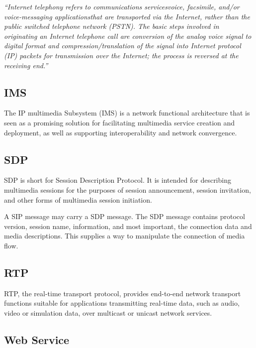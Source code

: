 \textit{``Internet telephony refers to communications services\textthreequartersemdash{}voice, facsimile, and/or voice-messaging applications\textthreequartersemdash{}that are transported via the Internet, rather than the public switched telephone network (PSTN). The basic steps involved in originating an Internet telephone call are conversion of the analog voice signal to digital format and compression/translation of the signal into Internet protocol (IP) packets for transmission over the Internet; the process is reversed at the receiving end.''} \cite{VoIPtheProtocol}


\subsection*{IMS}
\label{sec:IMS}
\label{sym:IMS}

The IP multimedia Subsystem (IMS) is a network functional architecture that is seen as a promising solution for facilitating multimedia service creation and deployment, as well as supporting interoperability and network convergence. \cite{IMSInNextGenerationNetworks}



\subsection*{SDP}
\label{sec:SDP}
\label{sym:SDP}

SDP is short for Session Description Protocol. It is intended for describing multimedia sessions for the purposes of session announcement, session invitation, and other forms of multimedia session initiation.  \cite{RFC4566}

A SIP message may carry a SDP message. The SDP message contains protocol version, session name, information, and most important, the connection data and media descriptions. This supplies a way to manipulate the connection of media flow.  \cite{RFC4566}

\subsection*{RTP}
\label{sec:RTP}
\label{sym:RTP}

RTP, the real-time transport protocol, provides end-to-end network transport functions suitable for applications transmitting real-time data, such as audio, video or simulation data, over multicast or unicast network services. \cite{RFC3550}

\subsection*{Web Service}


